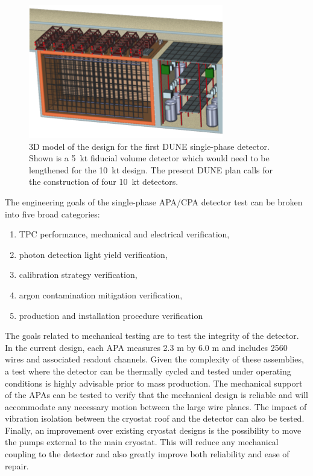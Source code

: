 \begin{figure}[!htb]
\centering
\begin{minipage}[b]{1.0\textwidth}
\begin{center}
\includegraphics[width=.75\textwidth]{figures/fardet-3D.png}
\end{center}
\end{minipage}
\caption{\small 3D model of the design for the first DUNE single-phase detector. Shown is a 5~kt fiducial volume detector which would need to be lengthened for the 10~kt design. The present DUNE plan calls for the construction of four 10~kt detectors. }
\label{fig:fardet-overview} 
\end{figure}

The engineering goals of the single-phase APA/CPA detector test can be broken into five broad categories: 
\begin{enumerate}
	\item TPC performance, mechanical and electrical verification, 
	\item photon detection light yield verification,
	\item calibration strategy verification,
	\item argon contamination mitigation verification, 
	\item production and installation procedure verification
\end{enumerate}

	 The goals related to mechanical testing are to test the integrity of the detector. In the current design, each APA measures 2.3 m by 6.0 m and includes 2560 wires and associated readout channels. Given the complexity of these assemblies, a test where the detector can be thermally cycled and tested under operating conditions is highly advisable prior to mass production. The mechanical support of the APAs can be tested to verify that the mechanical design is reliable and will accommodate any necessary motion between the large wire planes. The impact of vibration isolation between the cryostat roof and the detector can also be tested. Finally, an improvement over existing cryostat designs is the possibility to move the pumps external to the main cryostat. This will reduce any mechanical coupling to the detector and also greatly improve both reliability and ease of repair.

